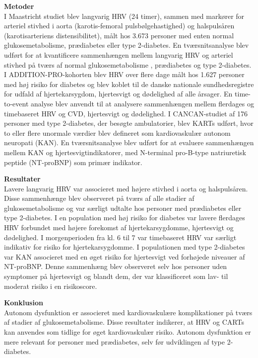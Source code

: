 \documentclass[
  a4paper,
  headsepline=true,
  open=left]{scrbook}
\begin{document}
\textbf{Metoder}\\
I Maastricht studiet blev langvarig HRV (24 timer), sammen med markører
for arteriel stivhed i aorta (karotis-femoral pulsbølgehastighed) og
halspulsåren (karotisarteriens distensibilitet), målt hos 3.673 personer
med enten normal glukosemetabolisme, prædiabetes eller type 2-diabetes.
En tværsnitsanalyse blev udført for at kvantificere sammenhængen mellem
langvarig HRV og arteriel stivhed på tværs af normal glukosemetabolisme
, prædiabetes og type 2-diabetes. I ADDITION-PRO-kohorten blev HRV over
flere dage målt hos 1.627 personer med høj risiko for diabetes og blev
koblet til de danske nationale sundhedsregistre for udfald af
hjertekarsygdom, hjertesvigt og dødelighed af alle årsager. En
time-to-event analyse blev anvendt til at analysere sammenhængen mellem
flerdages og timebaseret HRV og CVD, hjertesvigt og dødelighed. I
CANCAN-studiet af 176 personer med type 2-diabetes, der besøgte
ambulatorier, blev KARTs udført, hvor to eller flere unormale værdier
blev defineret som kardiovaskulær autonom neuropati (KAN). En
tværsnitsanalyse blev udført for at evaluere sammenhængen mellem KAN og
hjertesvigtindikatorer, med N-terminal pro-B-type natriuretisk peptide
(NT-proBNP) som primær indikator.

\textbf{Resultater}\\
Lavere langvarig HRV var associeret med højere stivhed i aorta og
halspulsåren. Disse sammenhænge blev observeret på tværs af alle stadier
af glukosemetabolisme og var særligt udtalte hos personer med
prædiabetes eller type 2-diabetes. I en population med høj risiko for
diabetes var lavere flerdages HRV forbundet med højere forekomst af
hjertekarsygdomme, hjertesvigt og dødelighed. I morgenperioden fra kl. 6
til 7 var timebaseret HRV var særligt indikativ for risiko for
hjertekarsygdomme. I populationen med type 2-diabetes var KAN associeret
med en øget risiko for hjertesvigt ved forhøjede niveauer af NT-proBNP.
Denne sammenhæng blev observeret selv hos personer uden symptomer på
hjertesvigt og blandt dem, der var klassificeret som lav- til moderat
risiko i en risikoscore.

\textbf{Konklusion}\\
Autonom dysfunktion er associeret med kardiovaskulære komplikationer på
tværs af stadier af glukosemetabolisme. Disse resultater indikerer, at
HRV og CARTs kan anvendes som tidlige for øget kardiovaskulær risiko.
Autonom dysfunktion er mere relevant for personer med prædiabetes, selv
før udviklingen af type 2-diabetes.
\end{document}
